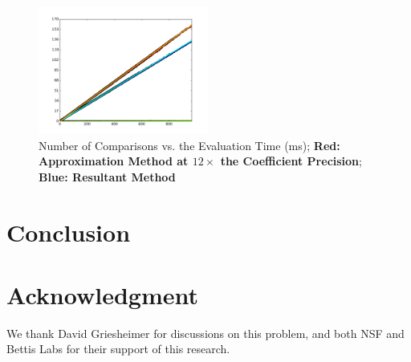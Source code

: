 \documentclass{cccg16}
\begin{document}
\begin{figure}
  \includegraphics[width=0.5\textwidth]{imgs/hardEllipsoidsSingle_gentoo_adjusted.png}
  \caption{Number of Comparisons vs. the Evaluation Time (ms); {\bf Red:
      Approximation Method at $12\times$ the Coefficient Precision};
    {\bf Blue: Resultant Method}}
\end{figure}

\section{Conclusion}

\section{Acknowledgment}
We thank David Griesheimer for discussions on this problem, and both NSF and Bettis Labs for their support of this research. 



\end{document}
